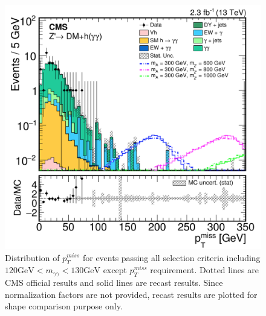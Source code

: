 \documentclass[12pt,A4paper]{article}
\begin{document}
\begin{figure}[h!]
\centering
	\includegraphics[scale=0.6]{img/overlayed.png}
\caption{Distribution of $p_T^{miss}$ for events passing all selection criteria including $120 \textrm{GeV} < m_{\gamma\gamma} < 130 \textrm{GeV}$ except $p_T^{miss}$ requirement. Dotted lines are CMS official results\cite{ref:paper} and solid lines are recast results. Since normalization factors are not provided, recast results are plotted for shape comparison purpose only.}
\end{figure}

\clearpage
\end{document}
